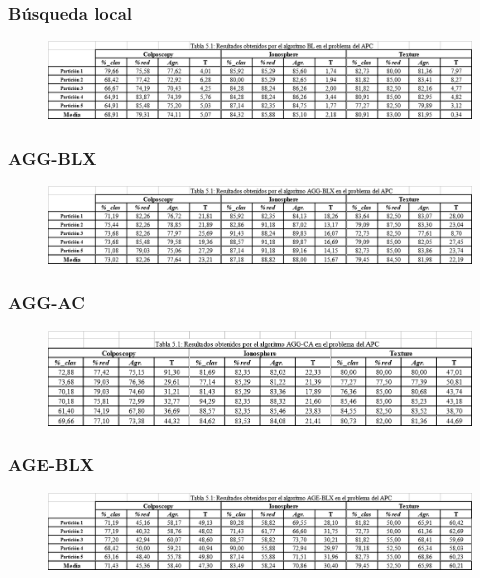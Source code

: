 \documentclass[12pt,a4paper]{article}
\begin{document}
\subsubsection{Búsqueda local}
\begin{figure}[H]
	\centering
	\includegraphics[width=0.7\linewidth]{images/poblacion3}
	\caption{}
	\label{fig:poblacion3}
\end{figure}
\subsubsection{AGG-BLX}
\begin{figure}
	\centering
	\includegraphics[width=0.7\linewidth]{images/poblacion5}
	\caption{}
	\label{fig:poblacion5}
\end{figure}

\subsubsection{AGG-AC}
\begin{figure}[H]
	\centering
	\includegraphics[width=0.7\linewidth]{images/poblacion4}
	\caption{}
	\label{fig:poblacion4}
\end{figure}

\subsubsection{AGE-BLX}
\begin{figure}[H]
	\centering
	\includegraphics[width=0.7\linewidth]{images/poblacion7}
	\caption{}
	\label{fig:poblacion7}
\end{figure}
\end{document}
